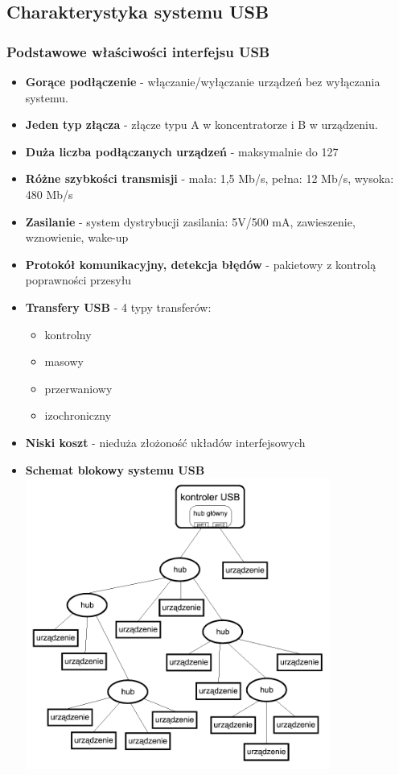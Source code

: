 \documentclass[a4paper,twoside]{article}
\begin{document}
	\subsection{Charakterystyka systemu USB}
		\subsubsection{Podstawowe właściwości interfejsu USB}
		\begin{itemize}
			\item \textbf{Gorące podłączenie} - włączanie/wyłączanie urządzeń bez wyłączania systemu.
			\item \textbf{Jeden typ złącza} - złącze typu A w koncentratorze i B w urządzeniu.
			\item \textbf{Duża liczba podłączanych urządzeń} - maksymalnie do 127
			\item \textbf{Różne szybkości transmisji} - mała: 1,5 Mb/s, pełna: 12 Mb/s, wysoka: 480 Mb/s
			\item \textbf{Zasilanie} - system dystrybucji zasilania: 5V/500 mA, zawieszenie, wznowienie, wake-up
			\item \textbf{Protokół komunikacyjny, detekcja błędów} - pakietowy z kontrolą poprawności przesyłu
			\item \textbf{Transfery USB} - 4 typy transferów:
				\begin{itemize}
					\item kontrolny
					\item masowy
					\item przerwaniowy
					\item izochroniczny
				\end{itemize}
			\item \textbf{Niski koszt} - nieduża złożoność układów interfejsowych
			\item \textbf{Schemat blokowy systemu USB}\\
			\includegraphics[width=10cm]{./wyklady/USB_6_1.pdf}
		\end{itemize}
\end{document}

